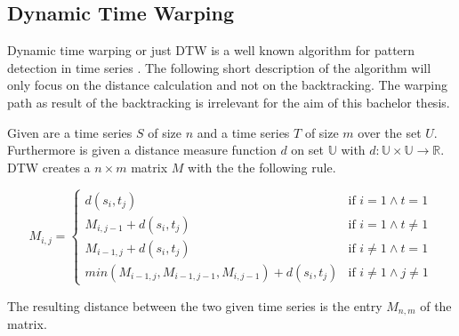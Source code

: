 \subsection{Dynamic Time Warping}
Dynamic time warping or just DTW is a well known algorithm for pattern detection in time series \cite{berndt1994using}.
The following short description of the algorithm will only focus on the distance calculation and not on the
backtracking. The warping path as result of the backtracking is irrelevant for the aim of this bachelor thesis.

Given are a time series $S$ of size $n$ and a time series $T$ of size $m$ over the set $U$. Furthermore is given a
distance measure function $d$ on set $\mathbb{U}$ with $d: \mathbb{U} \times \mathbb{U} \to \mathbb{R}$. DTW creates a
$n \times m$ matrix $M$ with the the following rule.
\begin{center} \[ M_{i, j} = \begin{cases}
    d(s_i,t_j) & \text{if } i = 1 \wedge t = 1\\
    M_{i,j-1} + d(s_i,t_j) & \text{if } i = 1 \wedge t \neq 1\\
    M_{i-1,j} + d(s_i,t_j) & \text{if } i \neq 1 \wedge t = 1\\
    min(M_{i-1,j}, M_{i-1,j-1}, M_{i,j-1}) + d(s_i,t_j) & \text{if } i \neq 1 \wedge j \neq 1
\end{cases} \] \end{center}
The resulting distance between the two given time series is the entry $M_{n,m}$ of the matrix.
